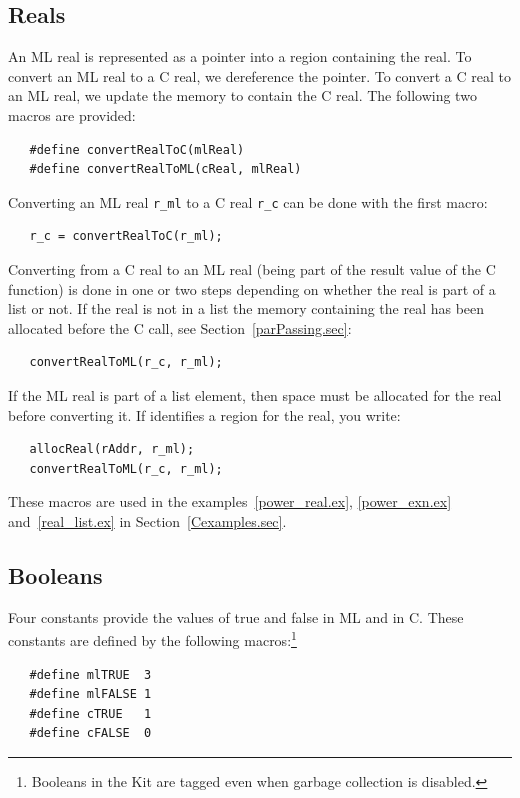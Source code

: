 \documentclass[12pt]{book}
\begin{document}
\subsection{Reals}
An ML real is represented as a pointer into a region containing the
real. To convert an ML real to a C real, we dereference the pointer. To
convert a C real to an ML real, we update the memory to contain the C
real. The following two macros are provided:
%
%
\begin{verbatim}
   #define convertRealToC(mlReal)
   #define convertRealToML(cReal, mlReal)
\end{verbatim}

Converting an ML real \verb|r_ml| to a C real \verb|r_c| can be done with the first macro:
\begin{verbatim}
   r_c = convertRealToC(r_ml);
\end{verbatim}

Converting from a C real to an ML real (being part of the result value of the
C function) is done in one or two steps depending on whether the real is
part of a list or not. If the real is not in a list the memory containing
the real has been allocated before the C call, see Section~\ref{parPassing.sec}:
\begin{verbatim}
   convertRealToML(r_c, r_ml);
\end{verbatim}
If the ML real is part of a list element, then space must be allocated for
the real before converting it. If  identifies a region
for the real, you write:
%
\begin{verbatim}
   allocReal(rAddr, r_ml);
   convertRealToML(r_c, r_ml);
\end{verbatim}

These macros are used in the examples~\ref{power_real.ex},
\ref{power_exn.ex} and~\ref{real_list.ex} in
Section~\ref{Cexamples.sec}.

\subsection{Booleans}
Four constants provide the values of true and false in ML and in
C. These constants are defined by the following macros:\footnote{Booleans in the
Kit are tagged even when garbage collection is disabled.}
%
%
%
%
\begin{verbatim}
   #define mlTRUE  3
   #define mlFALSE 1
   #define cTRUE   1
   #define cFALSE  0
\end{verbatim}
\end{document}
